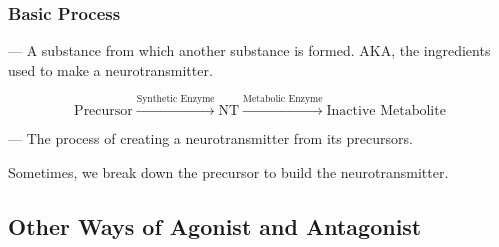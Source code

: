 \subsubsection{Basic Process}

\begin{coloredlist}
    \item {} — A substance from which another substance is formed. AKA, the ingredients used to make a neurotransmitter.
    \item \[
        \text{Precursor} \xrightarrow{\text{Synthetic Enzyme}} \text{NT} \xrightarrow{\text{Metabolic Enzyme}} \text{Inactive Metabolite}
    \]
    \begin{coloredlist}
        \item {} — The process of creating a neurotransmitter from its precursors.
        \item Sometimes, we break down the precursor to build the neurotransmitter.
    \end{coloredlist}
\end{coloredlist}


\subsection{Other Ways of Agonist and Antagonist}

